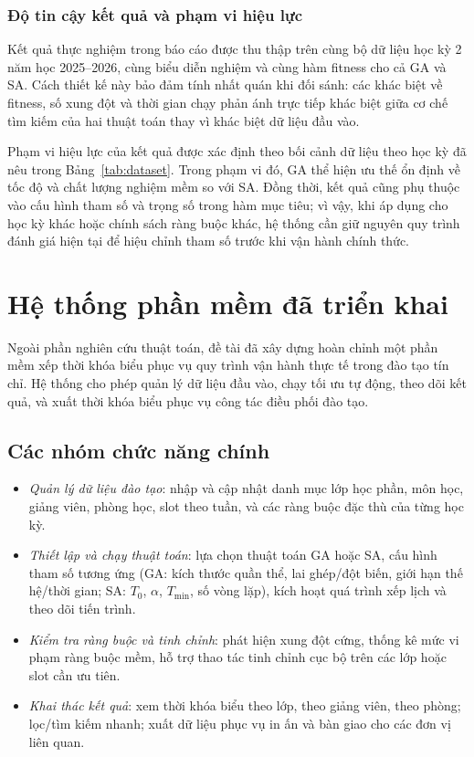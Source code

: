 \documentclass[a4paper,12pt,oneside]{article}
\begin{document}
	\subsubsection{Độ tin cậy kết quả và phạm vi hiệu lực}
	
	Kết quả thực nghiệm trong báo cáo được thu thập trên cùng bộ dữ liệu học kỳ 2 năm học 2025--2026, cùng biểu diễn nghiệm và cùng hàm fitness cho cả GA và SA. Cách thiết kế này bảo đảm tính nhất quán khi đối sánh: các khác biệt về fitness, số xung đột và thời gian chạy phản ánh trực tiếp khác biệt giữa cơ chế tìm kiếm của hai thuật toán thay vì khác biệt dữ liệu đầu vào.
	
	Phạm vi hiệu lực của kết quả được xác định theo bối cảnh dữ liệu theo học kỳ đã nêu trong Bảng~\ref{tab:dataset}. Trong phạm vi đó, GA thể hiện ưu thế ổn định về tốc độ và chất lượng nghiệm mềm so với SA. Đồng thời, kết quả cũng phụ thuộc vào cấu hình tham số và trọng số trong hàm mục tiêu; vì vậy, khi áp dụng cho học kỳ khác hoặc chính sách ràng buộc khác, hệ thống cần giữ nguyên quy trình đánh giá hiện tại để hiệu chỉnh tham số trước khi vận hành chính thức.
	
	\section{Hệ thống phần mềm đã triển khai}
	
	Ngoài phần nghiên cứu thuật toán, đề tài đã xây dựng hoàn chỉnh một phần mềm xếp thời khóa biểu phục vụ quy trình vận hành thực tế trong đào tạo tín chỉ. Hệ thống cho phép quản lý dữ liệu đầu vào, chạy tối ưu tự động, theo dõi kết quả, và xuất thời khóa biểu phục vụ công tác điều phối đào tạo.
	
	\subsection{Các nhóm chức năng chính}
	\begin{itemize}
		\item \textit{Quản lý dữ liệu đào tạo}: nhập và cập nhật danh mục lớp học phần, môn học, giảng viên, phòng học, slot theo tuần, và các ràng buộc đặc thù của từng học kỳ.
		\item \textit{Thiết lập và chạy thuật toán}: lựa chọn thuật toán GA hoặc SA, cấu hình tham số tương ứng (GA: kích thước quần thể, lai ghép/đột biến, giới hạn thế hệ/thời gian; SA: $T_0$, $\alpha$, $T_{\min}$, số vòng lặp), kích hoạt quá trình xếp lịch và theo dõi tiến trình.
		\item \textit{Kiểm tra ràng buộc và tinh chỉnh}: phát hiện xung đột cứng, thống kê mức vi phạm ràng buộc mềm, hỗ trợ thao tác tinh chỉnh cục bộ trên các lớp hoặc slot cần ưu tiên.
		\item \textit{Khai thác kết quả}: xem thời khóa biểu theo lớp, theo giảng viên, theo phòng; lọc/tìm kiếm nhanh; xuất dữ liệu phục vụ in ấn và bàn giao cho các đơn vị liên quan.
	\end{itemize}
	
\end{document}
